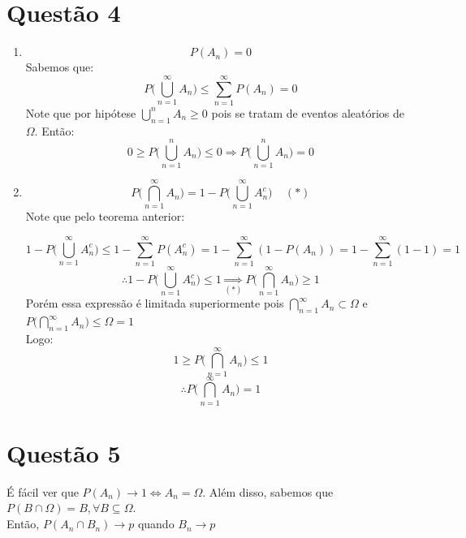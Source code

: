 \documentclass[a4paper,12pt]{report}
\begin{document}
		\section{Questão 4}
		\begin{enumerate}[label=\alph*)]
			\item 
	
		$$P(A_n)=0 $$
		Sabemos que:
		$$P\bigg(\bigcup\limits_{n=1}^{\infty}A_n \bigg) \le \sum\limits_{n=1}^{\infty}P(A_n)=0$$
		Note que por hipótese $\bigcup\limits_{n=1}^{n}A_n  \ge 0 $ pois se tratam de eventos aleatórios de $\Omega$. Então:
		$$ 0\ge P\bigg(\bigcup\limits_{n=1}^{n}A_n \bigg) \le 0 \Rightarrow  P\bigg(\bigcup\limits_{n=1}^{n}A_n \bigg) =0$$
		\item 
		$$P\bigg(\bigcap\limits_{n=1}^{\infty}A_n \bigg) = 1- P\bigg(\bigcup\limits_{n=1}^{\infty}A_n^c  \bigg) \ \ \ \ \ (*) $$
		Note que pelo teorema anterior:
		
		$$1- P\bigg(\bigcup\limits_{n=1}^{\infty}A_n^c  \bigg)\le 1- \sum\limits_{n=1}^{\infty}P(A_n^c) 
		=
		1- \sum\limits_{n=1}^{\infty}(1-P(A_n))= 1- \sum\limits_{n=1}^{\infty}(1-1)=1 
		$$
		$$\therefore 1- P\bigg(\bigcup\limits_{n=1}^{\infty}A_n^c  \bigg)\le1 \underset{(*)}{\Rightarrow}  P\bigg(\bigcap\limits_{n=1}^{\infty}A_n  \bigg)\ge 1$$
		Porém essa expressão é limitada superiormente pois $\bigcap\limits_{n=1}^{\infty}A_n\subset \Omega $ e $P\bigg(\bigcap\limits_{n=1}^{\infty}A_n\bigg)\le \Omega =1$\\
		Logo: 
		$$ 1\ge P\bigg(\bigcap\limits_{n=1}^{\infty}A_n  \bigg)\le 1$$
		$$\therefore P\bigg(\bigcap\limits_{n=1}^{\infty}A_n  \bigg)=1$$
			\end{enumerate}

		
		\section{Questão 5}
		É fácil ver  que  $P(A_n){\longrightarrow}1 \Leftrightarrow A_n = \Omega $. Além disso, sabemos que  $P(B\cap\Omega)= B, \forall  B\subseteq \Omega$.\\
		Então, $P(A_n\cap B_n)\rightarrow p$ quando $B_n \rightarrow p $
		
	
\end{document}
